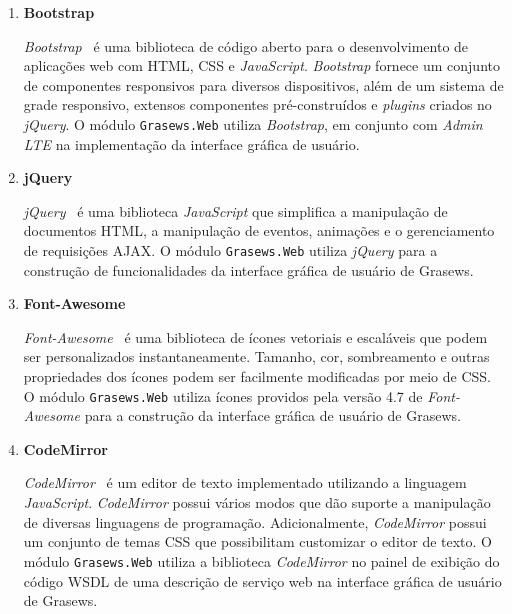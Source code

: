 \begin{enumerate}
  \item \textbf{Bootstrap}
  
  \textit{Bootstrap}~\cite{BOOTSTRAP-2019} é uma biblioteca de código aberto para o desenvolvimento de aplicações web com HTML, CSS e \textit{JavaScript}. \textit{Bootstrap} fornece um conjunto de componentes responsivos para diversos dispositivos, além de um sistema de grade responsivo, extensos componentes pré-construídos e \textit{plugins} criados no \textit{jQuery}. O módulo \texttt{Grasews.Web} utiliza \textit{Bootstrap}, em conjunto com \textit{Admin LTE} na implementação da interface gráfica de usuário.
  

  \item \textbf{jQuery}
  
  \textit{jQuery}~\cite{JQUERY-2019} é uma biblioteca \textit{JavaScript} que simplifica a manipulação de documentos HTML, a manipulação de eventos, animações e o gerenciamento de requisições AJAX. O módulo \texttt{Grasews.Web} utiliza \textit{jQuery} para a construção de funcionalidades da interface gráfica de usuário de Grasews.
  
  
  \item \textbf{Font-Awesome}
  
  \textit{Font-Awesome}~\cite{FONT-AWESOME-2019} é uma biblioteca de ícones vetoriais e escaláveis que podem ser personalizados instantaneamente. Tamanho, cor, sombreamento e outras propriedades dos ícones podem ser facilmente modificadas por meio de CSS. O módulo \texttt{Grasews.Web} utiliza ícones providos pela versão 4.7 de \textit{Font-Awesome} para a construção da interface gráfica de usuário de Grasews.
  
  
  \item \textbf{CodeMirror}
  
  \textit{CodeMirror}~\cite{CODEMIRROR-2019} é um editor de texto implementado utilizando a linguagem \textit{JavaScript}. \textit{CodeMirror} possui vários modos que dão suporte a manipulação de diversas linguagens de programação. Adicionalmente, \textit{CodeMirror} possui um conjunto de temas CSS que possibilitam customizar o editor de texto. O módulo \texttt{Grasews.Web} utiliza a biblioteca \textit{CodeMirror} no painel de exibição do código WSDL de uma descrição de serviço web na interface gráfica de usuário de Grasews.
  

\end{enumerate}
